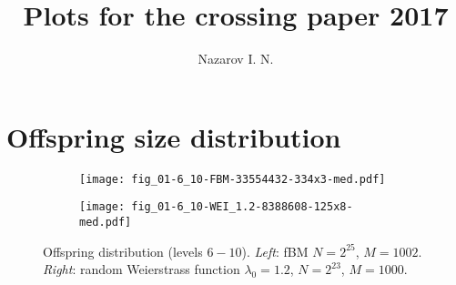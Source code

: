 \documentclass[a4paper]{extarticle}
\title{Plots for the crossing paper 2017}
\author{Nazarov I. N.}
\begin{document}
\maketitle
\tableofcontents
\listoffigures
\clearpage

\section{Offspring size distribution} %
\label{sec:offspring_size_distribution}

\begin{figure}[ht]
  \centering
  \begin{subfigure}[b]{0.45\textwidth}
    \texttt{[image: fig\_01-6\_10-FBM-33554432-334x3-med.pdf]}
  \end{subfigure}\hspace{-2.em}
  \begin{subfigure}[b]{0.45\textwidth}
    \texttt{[image: fig\_01-6\_10-WEI\_1.2-8388608-125x8-med.pdf]}
  \end{subfigure}\vspace{-.5em}

  \caption{Offspring distribution (levels $6-10$).
  \emph{Left}: fBM $N = 2^{25}$, $M=1002$.
  \emph{Right}: random Weierstrass function $\lambda_0=1.2$, $N = 2^{23}$, $M=1000$.}
  \label{fig:fbm_wei1_2_offspring}
\end{figure}
\end{document}

